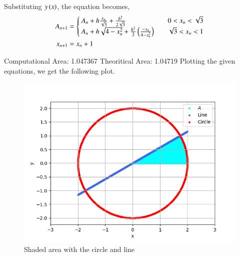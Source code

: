 \documentclass[journal]{IEEEtran}
\begin{document}
Substituting $y\left(x\right)$, the equation becomes,
\begin{align}
    A_{n + 1} &=
    \begin{cases}
        A_n + h\frac{x_n}{\sqrt{3}} + \frac{h^2}{2\sqrt{3}} & \quad 0 < x_n < \sqrt{3}\\
        A_n + h\sqrt{4 - x_n^2} + \frac{h^2}{2}\left(\frac{-x_n}{4 - x_n^2}\right) & \quad \sqrt{3} < x_n < 1
    \end{cases}\\
    x_{n + 1} &= x_n + 1
\end{align}

Computational Area: 1.047367
\newline
Theoritical Area: 1.04719
\newline
Plotting the given equations, we get the following plot.

\begin{figure}[h!]
   \centering
   \includegraphics[width=0.7\columnwidth]{figs/graph.png}
    \caption{Shaded area with the circle and line}
   \label{label}
\end{figure}
\end{document}
